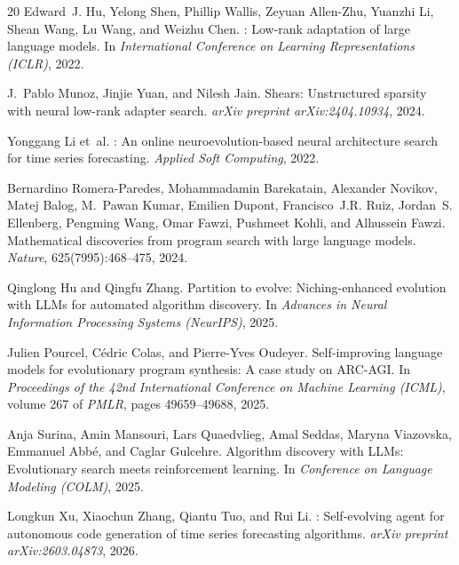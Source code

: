 \documentclass{article}
\begin{document}
\begin{thebibliography}{20}
Edward~J. Hu, Yelong Shen, Phillip Wallis, Zeyuan Allen-Zhu, Yuanzhi Li, Shean Wang, Lu Wang, and Weizhu Chen.
: Low-rank adaptation of large language models.
\newblock In \textit{International Conference on Learning Representations (ICLR)}, 2022.

J.~Pablo Munoz, Jinjie Yuan, and Nilesh Jain.
\newblock Shears: Unstructured sparsity with neural low-rank adapter search.
\newblock \textit{arXiv preprint arXiv:2404.10934}, 2024.

Yonggang Li et~al.
: An online neuroevolution-based neural architecture search for time series forecasting.
\newblock \textit{Applied Soft Computing}, 2022.

Bernardino Romera-Paredes, Mohammadamin Barekatain, Alexander Novikov, Matej Balog, M.~Pawan Kumar, Emilien Dupont, Francisco~J.R. Ruiz, Jordan~S. Ellenberg, Pengming Wang, Omar Fawzi, Pushmeet Kohli, and Alhussein Fawzi.
\newblock Mathematical discoveries from program search with large language models.
\newblock \textit{Nature}, 625(7995):468--475, 2024.

Qinglong Hu and Qingfu Zhang.
\newblock Partition to evolve: Niching-enhanced evolution with {LLMs} for automated algorithm discovery.
\newblock In \textit{Advances in Neural Information Processing Systems (NeurIPS)}, 2025.

Julien Pourcel, C\'{e}dric Colas, and Pierre-Yves Oudeyer.
\newblock Self-improving language models for evolutionary program synthesis: A case study on {ARC-AGI}.
\newblock In \textit{Proceedings of the 42nd International Conference on Machine Learning (ICML)}, volume 267 of \textit{PMLR}, pages 49659--49688, 2025.

Anja Surina, Amin Mansouri, Lars Quaedvlieg, Amal Seddas, Maryna Viazovska, Emmanuel Abb\'{e}, and Caglar Gulcehre.
\newblock Algorithm discovery with {LLMs}: Evolutionary search meets reinforcement learning.
\newblock In \textit{Conference on Language Modeling (COLM)}, 2025.

Longkun Xu, Xiaochun Zhang, Qiantu Tuo, and Rui Li.
: Self-evolving agent for autonomous code generation of time series forecasting algorithms.
\newblock \textit{arXiv preprint arXiv:2603.04873}, 2026.


\end{thebibliography}
\end{document}

